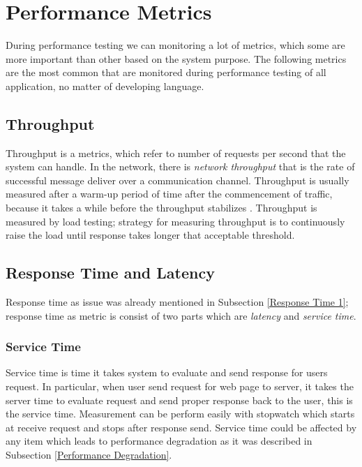 \section{Performance Metrics}
\label{Performance Metrics}

During performance testing we can monitoring a lot of metrics, which some are more important than other based on the system purpose. The following metrics are the most common that are monitored during performance testing of all application, no matter of developing language. 


\subsection{Throughput}
Throughput is a metrics, which refer to number of requests per second that the system can handle. In the network, there is \emph{network throughput} that is the rate of successful message deliver over a communication channel. Throughput is usually measured after a warm-up period of time after the commencement of traffic, because it takes a while before the throughput stabilizes . Throughput is measured by load testing; strategy for measuring throughput is to continuously raise the load until response takes longer that acceptable threshold.

\subsection{Response Time and Latency}
Response time as issue was already mentioned in Subsection \ref{Response Time 1}; response time as metric is consist of two parts which are \emph{latency} and \emph{service time}.

\subsubsection*{Service Time}
Service time is time it takes system to evaluate and send response for users request. In particular, when user send request for web page to server, it takes the server time to evaluate request and send proper response back to the user, this is the service time. Measurement can be perform easily with stopwatch which starts at receive request and stops after response send. Service time could be affected by any item which leads to performance degradation as it was described in Subsection \ref{Performance Degradation}. 

